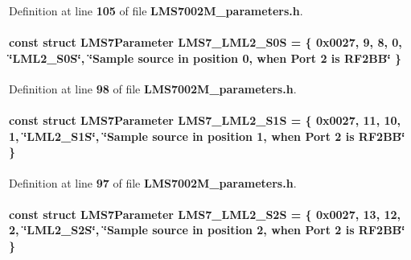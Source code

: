 Definition at line {\bf 105} of file {\bf L\+M\+S7002\+M\+\_\+parameters.\+h}.

\paragraph[{L\+M\+S7\+\_\+\+L\+M\+L2\+\_\+\+S0S}]{\setlength{\rightskip}{0pt plus 5cm}const struct {\bf L\+M\+S7\+Parameter} L\+M\+S7\+\_\+\+L\+M\+L2\+\_\+\+S0S = \{ 0x0027, 9, 8, 0, \char`\"{}\+L\+M\+L2\+\_\+\+S0\+S\char`\"{}, \char`\"{}\+Sample source in position 0, when Port 2 is R\+F2\+B\+B\char`\"{} \}\hspace{0.3cm}{\ttfamily [static]}}\label{LMS7002M__parameters_8h_a08445641b48485c4dda7acf9c93c336f}


Definition at line {\bf 98} of file {\bf L\+M\+S7002\+M\+\_\+parameters.\+h}.

\paragraph[{L\+M\+S7\+\_\+\+L\+M\+L2\+\_\+\+S1S}]{\setlength{\rightskip}{0pt plus 5cm}const struct {\bf L\+M\+S7\+Parameter} L\+M\+S7\+\_\+\+L\+M\+L2\+\_\+\+S1S = \{ 0x0027, 11, 10, 1, \char`\"{}\+L\+M\+L2\+\_\+\+S1\+S\char`\"{}, \char`\"{}\+Sample source in position 1, when Port 2 is R\+F2\+B\+B\char`\"{} \}\hspace{0.3cm}{\ttfamily [static]}}\label{LMS7002M__parameters_8h_a3af9b5d72cda6a0b21a13464d4333c87}


Definition at line {\bf 97} of file {\bf L\+M\+S7002\+M\+\_\+parameters.\+h}.

\paragraph[{L\+M\+S7\+\_\+\+L\+M\+L2\+\_\+\+S2S}]{\setlength{\rightskip}{0pt plus 5cm}const struct {\bf L\+M\+S7\+Parameter} L\+M\+S7\+\_\+\+L\+M\+L2\+\_\+\+S2S = \{ 0x0027, 13, 12, 2, \char`\"{}\+L\+M\+L2\+\_\+\+S2\+S\char`\"{}, \char`\"{}\+Sample source in position 2, when Port 2 is R\+F2\+B\+B\char`\"{} \}\hspace{0.3cm}{\ttfamily [static]}}\label{LMS7002M__parameters_8h_a27dd4bef14aede03821b9cb65b16e87e}


